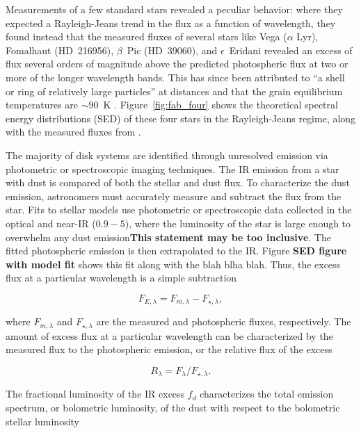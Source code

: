     
    
    Measurements of a few standard stars revealed a peculiar behavior: where they expected a Rayleigh-Jeans trend in the flux as a function of wavelength, they found instead that the measured fluxes of several stars like Vega ($\alpha$ Lyr), Fomalhaut (HD~216956), $\beta$~Pic (HD~39060), and $\epsilon$~Eridani revealed an excess of flux several orders of magnitude above the predicted photospheric flux at two or more of the longer wavelength bands. This has since been attributed to ``a shell or ring of relatively large particles'' at distances and that the grain equilibrium temperatures are $\sim90$~K \citep{Aumann1984, Backman1993}. Figure~\ref{fig:fab_four} shows the theoretical spectral energy distributions (SED) of these four stars in the Rayleigh-Jeans regime, along with the measured fluxes from \iras.
    

    The majority of disk systems are identified through unresolved emission via photometric or spectroscopic imaging techniques. The IR emission from a star with dust is compared of both the stellar and dust flux. To characterize the dust emission, astronomers must accurately measure and subtract the flux from the star. Fits to stellar models use photometric or spectroscopic data collected in the optical and near-IR ($0.9-5$\micron), where the luminosity of the star is large enough to overwhelm any dust emission\textbf{This statement may be too inclusive}. The fitted photospheric emission is then extrapolated to the IR. Figure \textbf{SED figure with model fit} shows this fit along with the blah blha blah. Thus, the excess flux at a particular wavelength is a simple subtraction
    
    \begin{equation}\label{eq:excess+flux}
    F_{E,\lambda} = F_{m,\lambda} - F_{\star,\lambda},
    \end{equation}
    
    \noindent where $F_{m,\lambda}$ and $F_{\star,\lambda}$ are the measured and photospheric fluxes, respectively. The amount of excess flux at a particular wavelength can be characterized by the measured flux to the photospheric emission, or the relative flux of the excess
        
        \begin{equation}\label{eq:rel_excess}
        R_\lambda = F_\lambda / F_{\star,\lambda}.
        \end{equation}
        
        \noindent The fractional luminosity of the IR excess $f_d$ characterizes the total emission spectrum, or bolometric luminosity, of the dust with respect to the bolometric stellar luminosity
        
